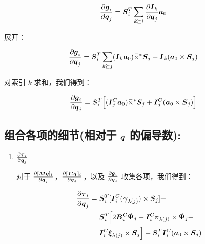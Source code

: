 \documentclass[letterpaper, 10 pt, conference]{ieeetran}  %
\begin{document}
{\begin{enumerate}
\begin{equation}
     \frac{\partial \g_{i}}{ \partial \q_{j}} =  \Phibar_{i}^{T} \sum_{k \succeq i} \frac{\partial\I_{k} }{\partial \q_{j}} \a_{0} 
    \label{gFO_eqn_4}
\end{equation}

展开： 

\begin{equation}
     \frac{\partial \g_{i}}{ \partial \q_{j}} =  \Phibar_{i}^{T} \sum_{k \succeq j} (\I_{k} \a_{0}) \crff \Phibar_{j} +\I_{k}(\a_{0} \times \Phibar_{j}) 
    \label{gFO_eqn_5}
\end{equation}

对索引 $k$ 求和，我们得到：

\begin{equation}
     \frac{\partial \g_{i}}{ \partial \q_{j}} = \Phibar_{i}^{T} \Big[(\I_{j}^{C} \a_{0})\crff \Phibar_{j}+ \I_{j}^{C}(\a_{0} \times \Phibar_{j}) \Big]
    \label{gFO_eqn_6}
\end{equation}
    
\end{enumerate}

\subsection{组合各项的细节(相对于 $\boldsymbol{q}$ 的偏导数):}
\label{combine_terms}

\begin{enumerate}
    \item $\frac{\partial \boldsymbol{\tau}_{i}}{\partial \boldsymbol{q}_{j}}$

对于 $\frac{\partial [ \boldsymbol{M} \ddot{\boldsymbol{q}}]_{i}}{\partial \boldsymbol{q}_{j}}$，$  \frac{\partial  [\,\boldsymbol{C} \dot{\boldsymbol{q}}\,]_{i}}{\partial \boldsymbol{q}_{j}}$，以及 $ \frac{\partial \boldsymbol{g}_{i}}{ \partial \boldsymbol{q}_{j}}$ 收集各项，我们得到：

\begin{equation}
    \begin{aligned}
    \frac{\partial \boldsymbol{\tau}_{i}}{\partial \boldsymbol{q}_{j}} &= \boldsymbol{S}_{i}^{T} [  \boldsymbol{I}{}_{i}^{C}  (\boldsymbol{\gamma}_{\lambda(j)} )  \times \boldsymbol{S}_{j} ]  + \\&~~~~
    \boldsymbol{S}_{i}^{T}  \Big[  2 \boldsymbol{B}{}_{i}^{C} \,\dot{\!\boldsymbol{\Psi}}_{j}  +     \boldsymbol{I}{}_{i}^{C} \boldsymbol{v}_{\lambda(j)} \times \,\dot{\!\boldsymbol{\Psi}}_{j}   + \\&~~~~
    \boldsymbol{I}{}_{i}^{C} \boldsymbol{\xi}_{\lambda(j)} \times \boldsymbol{S}_{j}  \Big]  + 
   \boldsymbol{S}_{i}^{T}  \boldsymbol{I}{}_{i}^{C}(\boldsymbol{a}_{0} \times \boldsymbol{S}_{j})
    \end{aligned}
\end{equation}


\end{enumerate}}
\end{document}
